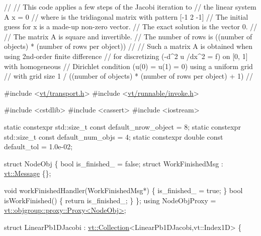 \begin{DoxyCodeInclude}

\textcolor{comment}{//}
\textcolor{comment}{// This code applies a few steps of the Jacobi iteration to}
\textcolor{comment}{// the linear system  A x = 0}
\textcolor{comment}{// where is the tridiagonal matrix with pattern [-1 2 -1]}
\textcolor{comment}{// The initial guess for x is a made-up non-zero vector.}
\textcolor{comment}{// The exact solution is the vector 0.}
\textcolor{comment}{//}
\textcolor{comment}{// The matrix A is square and invertible.}
\textcolor{comment}{// The number of rows is ((number of objects) * (number of rows per object))}
\textcolor{comment}{//}
\textcolor{comment}{// Such a matrix A is obtained when using 2nd-order finite difference}
\textcolor{comment}{// for discretizing (-d^2 u /dx^2 = f) on [0, 1] with homogeneous}
\textcolor{comment}{// Dirichlet condition (u(0) = u(1) = 0) using a uniform grid}
\textcolor{comment}{// with grid size 1 / ((number of objects) * (number of rows per object) + 1)}
\textcolor{comment}{//}


\textcolor{preprocessor}{#include <\hyperlink{transport_8h}{vt/transport.h}>}
\textcolor{preprocessor}{#include <\hyperlink{invoke_8h}{vt/runnable/invoke.h}>}

\textcolor{preprocessor}{#include <cstdlib>}
\textcolor{preprocessor}{#include <cassert>}
\textcolor{preprocessor}{#include <iostream>}

\textcolor{keyword}{static} constexpr std::size\_t \textcolor{keyword}{const} default\_nrow\_object = 8;
\textcolor{keyword}{static} constexpr std::size\_t \textcolor{keyword}{const} default\_num\_objs = 4;
\textcolor{keyword}{static} constexpr \textcolor{keywordtype}{double} \textcolor{keyword}{const} default\_tol = 1.0e-02;

\textcolor{keyword}{struct }NodeObj \{
  \textcolor{keywordtype}{bool} is\_finished\_ = \textcolor{keyword}{false};
  \textcolor{keyword}{struct }WorkFinishedMsg : \hyperlink{structvt_1_1messaging_1_1_active_msg}{vt::Message} \{\};

  \textcolor{keywordtype}{void} workFinishedHandler(WorkFinishedMsg*) \{ is\_finished\_ = \textcolor{keyword}{true}; \}
  \textcolor{keywordtype}{bool} isWorkFinished() \{ \textcolor{keywordflow}{return} is\_finished\_; \}
\};
\textcolor{keyword}{using} NodeObjProxy = \hyperlink{structvt_1_1objgroup_1_1proxy_1_1_proxy}{vt::objgroup::proxy::Proxy<NodeObj>};

\textcolor{keyword}{struct }LinearPb1DJacobi : \hyperlink{structvt_1_1vrt_1_1collection_1_1_collection}{vt::Collection}<LinearPb1DJacobi,vt::Index1D> \{


\end{DoxyCodeInclude}
